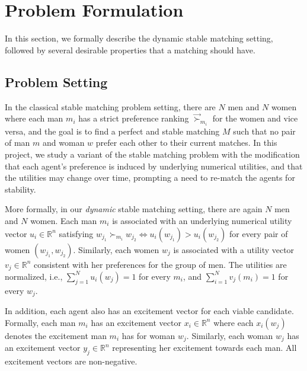 \section{Problem Formulation}
In this section, we formally describe the dynamic stable matching setting, followed by several desirable properties that a matching should have.
\subsection{Problem Setting}
In the classical stable matching problem setting, there are $N$ men and $N$ women where each man $m_i$ has a strict preference ranking $\overrightarrow{\succ}_{m_i}$ for the women and vice versa, and the goal is to find a perfect and stable matching $M$ such that no pair of man $m$ and woman $w$ prefer each other to their current matches. In this project, we study a variant of the stable matching problem with the modification that each agent's preference is induced by underlying numerical utilities, and that the utilities may change over time, prompting a need to re-match the agents for stability.

More formally, in our \textit{dynamic} stable matching setting, there are again $N$ men and $N$ women. Each man $m_i$ is associated with an underlying numerical utility vector $u_i \in \mathbb{R}^n$ satisfying $w_{j_1} \succ_{m_i} w_{j_2} \Leftrightarrow u_i(w_{j_1}) > u_i(w_{j_2})$ for every pair of women $(w_{j_1}, w_{j_2})$. Similarly, each women $w_j$ is associated with a utility vector $v_j \in \mathbb{R}^n$ consistent with her preferences for the group of men. The utilities are normalized, i.e., $\sum_{j=1}^N{u_i(w_j)} = 1$ for every $m_i$, and $\sum_{i=1}^N{v_j(m_i)} = 1$ for every $w_j$.

In addition, each agent also has an excitement vector for each viable candidate. Formally, each man $m_i$ has an excitement vector $x_i \in \mathbb{R}^n$ where each $x_i(w_j)$ denotes the excitement man $m_i$ has for woman $w_j$. Similarly, each woman $w_j$ has an excitement vector $y_j \in \mathbb{R}^n$ representing her excitement towards each man. All excitement vectors are non-negative.

